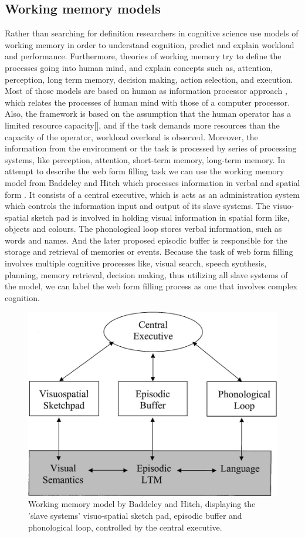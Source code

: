 \documentclass[a4paper]{report}
\begin{document}
			\subsection{Working memory models}
			Rather than searching for definition researchers in cognitive science use models of working memory in order to understand cognition, predict and explain workload and performance. Furthermore, theories of working memory try to define the processes going into human mind, and explain concepts such as, attention, perception, long term memory, decision making, action selection, and execution\cite{wickens-1988,baddeley1974working,miller1956magical}. Most of those models are based on human as information processor approach \cite{broadbent1,broadbent2,neisser,wickens-1988}, which relates the processes of human mind with those of a computer processor. Also, the framework is based on the assumption that the human operator has a limited resource capacity[], and if the task demands more resources than the capacity of the operator, workload overload is observed. Moreover, the information from the environment or the task is processed by series of processing systems, like perception, attention, short-term memory, long-term memory. 
			In attempt to describe the web form filling task we can use the working memory model from Baddeley and Hitch \cite{baddeley1974working} which processes information in verbal and spatial form  . It consists of a central executive, which is acts as an administration system which controls the information input and output of its slave systems. The visuo-spatial sketch pad is involved in holding visual information in spatial form like, objects and colours. The phonological loop stores verbal information, such as words and names. And the later proposed \cite{baddeley2000episodic} episodic buffer is responsible for the storage and retrieval of memories or events. Because the task of web form filling involves multiple cognitive processes like, visual search, speech synthesis, planning, memory retrieval, decision making, thus utilizing all slave systems of the model, we can label the web form filling process as one that involves complex cognition. 
				\begin{figure}[t]
					\centering
					\includegraphics[width=0.5\linewidth]{baddeley-wm}
					\caption[Baddeley and Hitch Working memory model]{Working memory model by Baddeley and Hitch, displaying the 'slave systems' visuo-spatial sketch pad, episodic buffer and phonological loop, controlled by the central executive.}
					\label{fig:baddeley-wm}
				\end{figure}		
				
\end{document}
